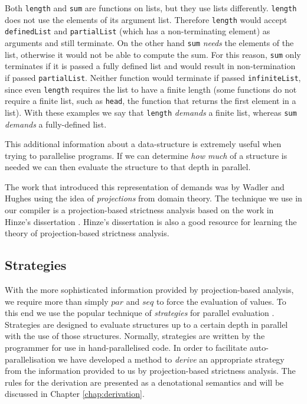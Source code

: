 Both \verb-length- and \verb-sum- are functions on lists, but they use lists
differently. \verb-length- does not use the elements of its argument list.
Therefore \verb-length- would accept \verb-definedList- and \verb-partialList-
(which has a non-terminating element) as arguments and still terminate.
On the other hand \verb-sum- \emph{needs} the elements of the list,
otherwise it would not be able to compute the sum. For this reason, \verb-sum-
only terminates if it is passed a fully defined list and would result in
non-termination if passed \verb-partialList-. Neither function would terminate
if passed \verb-infiniteList-, since even \verb-length- requires the list to
have a finite length (some functions do not require a finite list, such as
\verb-head-, the function that returns the first element in a list). With
these examples we say that \verb-length- \emph{demands} a finite list, whereas
\verb-sum- \emph{demands} a fully-defined list.

This additional information about a data-structure is extremely useful when
trying to parallelise programs. If we can determine \emph{how much} of a
structure is needed we can then evaluate the structure to that depth in
parallel.


The work that introduced this representation of demands was by Wadler and
Hughes \citep{wadler1987projections} using the idea of \emph{projections} from
domain theory.  The technique we use in our compiler is a projection-based
strictness analysis based on the work in Hinze's dissertation
\citep{hinze1995projection}.  Hinze's dissertation is also a good resource for
learning the theory of projection-based strictness analysis.


\subsection*{Strategies}

With the more sophisticated information provided by projection-based analysis,
we require more than simply $par$ and $seq$ to force the evaluation of values.
To this end we use the popular technique of \emph{strategies} for parallel
evaluation \citep{strategies, marlow2010seq}. Strategies are designed to
evaluate structures up to a certain depth in parallel with the use of those structures. Normally, strategies
are written by the programmer for use in hand-parallelised code. In order to
facilitate auto-parallelisation we have developed a method to \emph{derive} an
appropriate strategy from the information provided to us by projection-based
strictness analysis. The rules for the derivation are presented as a
denotational semantics and will be discussed in Chapter \ref{chap:derivation}.
